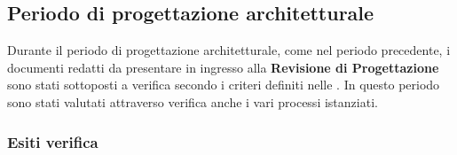 \subsection{Periodo di progettazione architetturale}
Durante il periodo di progettazione architetturale, come nel periodo precedente, i documenti redatti da presentare in ingresso alla \textbf{Revisione di Progettazione} sono stati sottoposti a verifica secondo i criteri definiti nelle . In questo periodo sono stati valutati attraverso verifica anche i vari processi istanziati.
\subsubsection{Esiti verifica}

